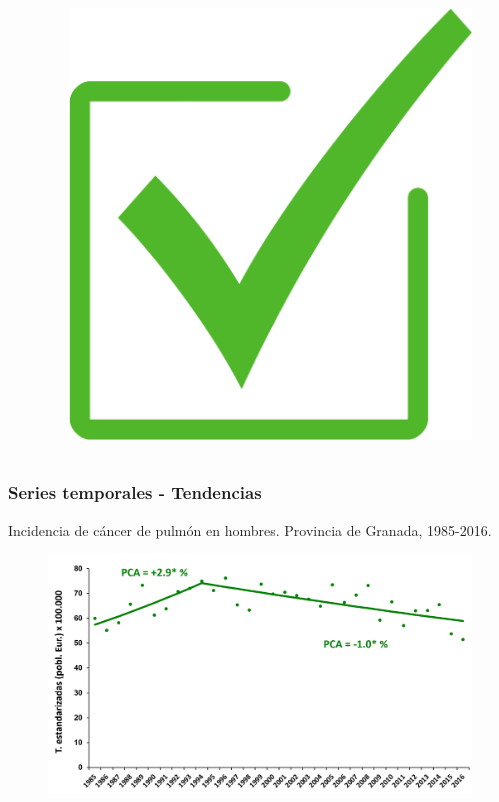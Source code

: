 \documentclass{beamer}
\begin{document}
\begin{frame}
	\pause
	\vspace{-110pt}
	\begin{columns}
		\begin{column}{.5\textwidth}
		\end{column}
		\begin{column}{.5\textwidth}
			\begin{figure}
				\centering
				\hspace{20pt}\includegraphics[width=.4\textwidth]{images/check.png}
			\end{figure}
		\end{column}
	\end{columns}
\end{frame}

\begin{frame}\frametitle{Series temporales - Tendencias}
	
	\centering
	Incidencia de cáncer de pulmón en hombres. Provincia de Granada, 1985-2016.
	\begin{figure}
		\centering
		\includegraphics[width=\textwidth]{images/tendencias_pulmon1.png}
	\end{figure}
	
\end{frame}
\end{document}
